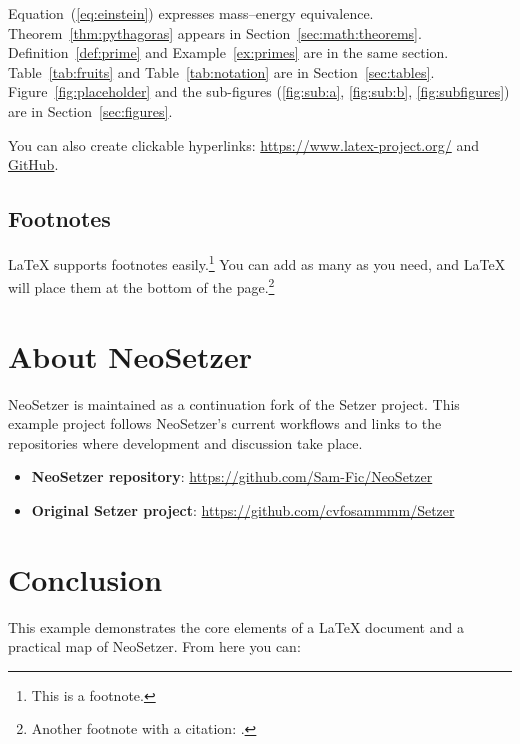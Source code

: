\documentclass[11pt]{article}
\theoremstyle{definition}
\theoremstyle{plain}
\begin{document}
Equation~(\ref{eq:einstein}) expresses mass--energy equivalence.
Theorem~\ref{thm:pythagoras} appears in Section~\ref{sec:math:theorems}.
Definition~\ref{def:prime} and Example~\ref{ex:primes} are in the same
section.
Table~\ref{tab:fruits} and Table~\ref{tab:notation} are in
Section~\ref{sec:tables}.
Figure~\ref{fig:placeholder} and the sub-figures
(\ref{fig:sub:a}, \ref{fig:sub:b}, \ref{fig:subfigures}) are in
Section~\ref{sec:figures}.

You can also create clickable hyperlinks:
\url{https://www.latex-project.org/} and
\href{https://github.com/}{GitHub}.

\subsection{Footnotes}
\label{sec:references:footnotes}

\LaTeX{} supports footnotes easily.\footnote{This is a footnote.}
You can add as many as you need, and \LaTeX{} will place them at the
bottom of the page.\footnote{Another footnote with a citation:
\cite{knuth1986}.}



\section{About NeoSetzer}
\label{sec:about}

NeoSetzer is maintained as a continuation fork of the Setzer project. This
example project follows NeoSetzer's current workflows and links to the
repositories where development and discussion take place.

\begin{itemize}[noitemsep]
    \item \textbf{NeoSetzer repository}: \url{https://github.com/Sam-Fic/NeoSetzer}
    \item \textbf{Original Setzer project}: \url{https://github.com/cvfosammmm/Setzer}
\end{itemize}

\section{Conclusion}
\label{sec:conclusion}

This example demonstrates the core elements of a \LaTeX{} document and a
practical map of NeoSetzer. From here you can:
\end{document}

